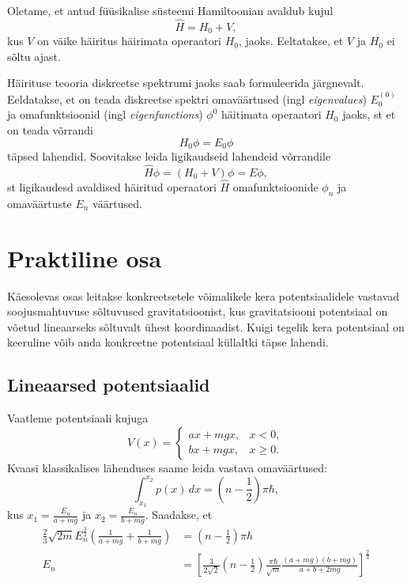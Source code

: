 \documentclass{trkut}%
\begin{document}
Oletame, et antud füüsikalise süsteemi Hamiltoonian avaldub kujul 
\begin{equation}
    \hat{H}=H_0+V,
\end{equation}
kus \(V\) on väike häiritus häirimata operaatori \(H_0\), jaoks. Eeltatakse, et \(V\) ja \(H_0\) ei sõltu ajast. 

Häirituse teooria diskreetse spektrumi jaoks saab formuleerida järgnevalt. Eeldatakse, et on teada diskreetse spektri omaväärtused (ingl  \textit{eigenvalues}) \(E_0^{(0)}\) ja omafunktsioonid (ingl \textit{eigenfunctions}) \(\phi^0\) häitimata operaatori \(H_0\) jaoks, st et on teada võrrandi
\begin{equation}
    H_0 \phi=E_0 \phi
\end{equation}
täpsed lahendid. Soovitakse leida ligikaudseid lahendeid võrrandile
\begin{equation}
    \hat{H} \phi=(H_0+V)\phi=E\phi,
\end{equation}
st ligikaudesd avaldised häiritud operaatori \(\hat{H}\) omafunktsioonide \(\phi_n\) ja omaväärtuste \(E_n\) väärtused.\cite{landau05}

\chapter{Praktiline osa}

Käesolevas osas leitakse konkreetsetele võimalikele kera potentsiaalidele vastavad soojusmahtuvuse sõltuvused gravitatsioonist, kus gravitatsiooni potentsiaal on võetud lineaarseks sõltuvalt ühest koordinaadist. Kuigi tegelik kera potentsiaal on keeruline võib anda konkreetne potentsiaal küllaltki täpse lahendi.

\section{Lineaarsed potentsiaalid}
Vaatleme potentsiaali kujuga 
\begin{equation}
    V(x)=\begin{cases}
        ax+mgx, & x<0,\\
        bx+mgx, & x\ge0.
    \end{cases}
\end{equation}
Kvaasi klassikalises lähenduses saame leida vastava omaväärtused:
\begin{equation}
    \int_{x_1}^{x_2} p(x)\, dx=\left( n-\frac{1}{2}\right)\pi \hbar,
\end{equation}
kus \(x_1=\frac{E_n}{a+mg}\) ja \(x_2=\frac{E_n}{b+mg}\). Saadakse, et 
\begin{align}
    \frac{2}{3}\sqrt{2m} E_n^{\frac{3}{2}} (\frac{1}{a+mg}+\frac{1}{b+mg}) &= \left(n-\frac{1}{2}\right) \pi \hbar\\
    E_n &=\left[\frac{3}{2\sqrt{2}} \left(n-\frac{1}{2}\right) \frac{\pi \hbar}{\sqrt{m}} \frac{(a+mg)(b+mg)}{a+b+2mg}\right]^{\frac{2}{3}}
\end{align}
\end{document}
